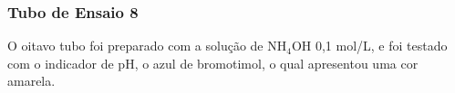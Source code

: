     \newpage
	\subsubsection{Tubo de Ensaio 8}	
        \indent O oitavo tubo foi preparado com a solução de NH$_4$OH 0,1 mol/L, e foi testado com o indicador de pH, o azul de bromotimol, o qual apresentou uma cor amarela.

        \begin{figure}[h]
            \centering
            \qquad
            \label{fig:experimento17}
        \end{figure}
    

